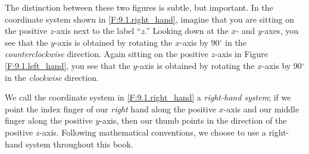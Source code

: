 The distinction between these two figures is subtle, but important.
In the coordinate system shown in \ref{F:9.1.right_hand}, imagine that
you are sitting on the positive $z$-axis next to the label ``$z$.''
Looking down at the $x$- and $y$-axes, you see that the $y$-axis is
obtained by rotating the $x$-axis by 90$^\circ$ in the {\em
  counterclockwise} direction.  Again sitting on the positive $z$-axis
in Figure \ref{F:9.1.left_hand}, you see that the $y$-axis is obtained
by rotating the $x$-axis by 90$^\circ$ in the {\em clockwise}
direction.


We call the coordinate system in \ref{F:9.1.right_hand} a {\em
  right-hand system}; if we point the index finger of our {\em right}
hand along the positive $x$-axis and our middle finger along the
positive $y$-axis, then our thumb points in the direction of the
positive $z$-axis.  Following mathematical conventions, we choose to
use a right-hand system throughout this book.


